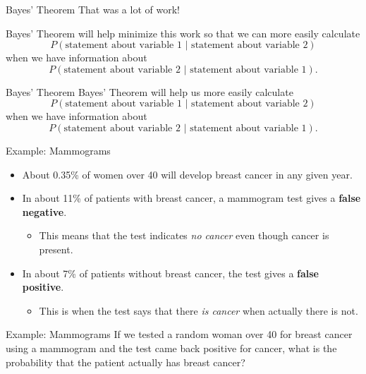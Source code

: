 \begin{frame}{Bayes' Theorem}
    That was a lot of work! 
    
    \vspace{12pt} Bayes' Theorem will help minimize this work so that we can more easily calculate
    \[
        P(\text{statement about variable 1 }|\text{ statement about variable 2})
    \]
    when we have information about
    \[
        P(\text{statement about variable 2 }|\text{ statement about variable 1}).
    \]
\end{frame}

\begin{frame}{Bayes' Theorem}
    \vspace{12pt} Bayes' Theorem will help us more easily calculate
    \[
        P(\text{statement about variable 1 }|\text{ statement about variable 2})
    \]
    when we have information about
    \[
        P(\text{statement about variable 2 }|\text{ statement about variable 1}).
    \]
\end{frame}

\begin{frame}{Example: Mammograms}
    \begin{itemize}
        \item About 0.35\% of women over 40 will develop breast cancer in any given year.
        \item In about 11\% of patients with breast cancer, a mammogram test gives a \textbf{false negative}.
        \begin{itemize}
            \item This means that the test indicates \textit{no cancer} even though cancer is present.
        \end{itemize}
        \item In about 7\% of patients without breast cancer, the test gives a \textbf{false positive}.
        \begin{itemize}
            \item This is when the test says that there \textit{is cancer} when actually there is not.
        \end{itemize}
    \end{itemize}
\end{frame}

\begin{frame}{Example: Mammograms}
    If we tested a random woman over 40 for breast cancer using a mammogram and the test came back positive for cancer, what is the probability that the patient actually has breast cancer?
\end{frame}

